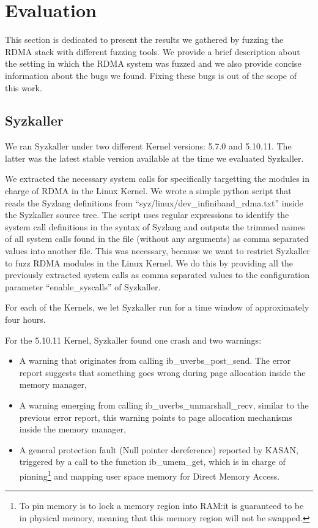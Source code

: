 \section{Evaluation}\label{s:evaluation}

This section is dedicated to present the results we gathered
by fuzzing the RDMA stack with different fuzzing tools. We provide
a brief description about the setting in which the RDMA system was fuzzed
and we also provide concise information about the bugs we found. Fixing these
bugs is out of the scope of this work.



\subsection{Syzkaller}

We ran Syzkaller under two different Kernel versions: 5.7.0 and 5.10.11. The latter was
the latest stable version available at the time we evaluated Syzkaller.

We extracted the necessary system calls for specifically targetting the modules
in charge of RDMA in the Linux Kernel. We wrote a simple python script
that reads the Syzlang definitions from ``syz/linux/dev\_infiniband\_rdma.txt'' inside the
Syzkaller source tree. The script uses regular expressions to identify the system call definitions
in the syntax of Syzlang and outputs the trimmed names of all system calls found in the file (without any arguments)
as comma separated values into another file. This was necessary, because we want to restrict Syzkaller
to fuzz RDMA modules in the Linux Kernel. We do this by providing all the previously extracted system calls
as comma separated values to the configuration parameter ``enable\_syscalls'' of Syzkaller.

For each of the Kernels, we let Syzkaller run for a time window of approximately four hours.

For the 5.10.11 Kernel, Syzkaller found one crash and two warnings:
\begin{itemize}
  \item A warning that originates from calling ib\_uverbs\_post\_send. The error report suggests that something goes wrong during page allocation inside the memory manager, %
  \item A warning emerging from calling ib\_uverbs\_unmarshall\_recv, similar to the previous error report, this warning points to page allocation mechanisms inside the memory manager,
  \item A general protection fault (Null pointer dereference) reported by KASAN, triggered by a call to the function ib\_umem\_get, which is in charge of pinning\footnote{To pin memory is to lock a memory region into RAM:\@ it is guaranteed to be in physical memory, meaning that this memory region will not be swapped\cite{kerriskLinuxProgrammingInterface2010}.} and mapping user space memory for Direct Memory Access.  %
\end{itemize}

